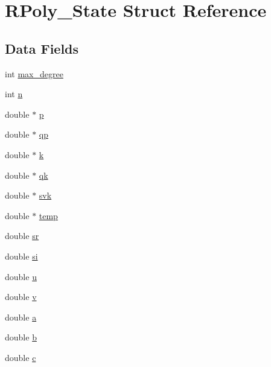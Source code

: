 \hypertarget{struct_r_poly___state}{}\section{R\+Poly\+\_\+\+State Struct Reference}
\label{struct_r_poly___state}
\subsection*{Data Fields}
\begin{DoxyCompactItemize}
\item 
int \mbox{\hyperlink{struct_r_poly___state_a8eabc621540d71c2a7e3076d6c3826bc}{max\+\_\+degree}}
\item 
int \mbox{\hyperlink{struct_r_poly___state_a76f11d9a0a47b94f72c2d0e77fb32240}{n}}
\item 
double $\ast$ \mbox{\hyperlink{struct_r_poly___state_a581f9e6b0ae1bb5b0a323185403461cf}{p}}
\item 
double $\ast$ \mbox{\hyperlink{struct_r_poly___state_add54d4105f979f122bc3a7b2543ea6de}{qp}}
\item 
double $\ast$ \mbox{\hyperlink{struct_r_poly___state_a24209e3d6a9400c0ae32208f7c0c40f5}{k}}
\item 
double $\ast$ \mbox{\hyperlink{struct_r_poly___state_a718f4cb6b5d0889a92892c2babee622a}{qk}}
\item 
double $\ast$ \mbox{\hyperlink{struct_r_poly___state_aa59d711f886b181955bbb39849942cb9}{svk}}
\item 
double $\ast$ \mbox{\hyperlink{struct_r_poly___state_a5ba843ea941644bfad9c98c84d85d910}{temp}}
\item 
double \mbox{\hyperlink{struct_r_poly___state_a866899e74209205c48e6ffe4889887a3}{sr}}
\item 
double \mbox{\hyperlink{struct_r_poly___state_a592a15876164ef5c9e5e500124619412}{si}}
\item 
double \mbox{\hyperlink{struct_r_poly___state_aed08c8478a62910aab06ba708a0e5b5f}{u}}
\item 
double \mbox{\hyperlink{struct_r_poly___state_a3b90d5a73541ab9402511d87bed076ef}{v}}
\item 
double \mbox{\hyperlink{struct_r_poly___state_a1031d0e0a97a340abfe0a6ab9e831045}{a}}
\item 
double \mbox{\hyperlink{struct_r_poly___state_a1510a66dacf9cf3586de5fc89ae2a073}{b}}
\item 
double \mbox{\hyperlink{struct_r_poly___state_a2c09e929a6ea340fc9653cca414b11d3}{c}}

\end{DoxyCompactItemize}
